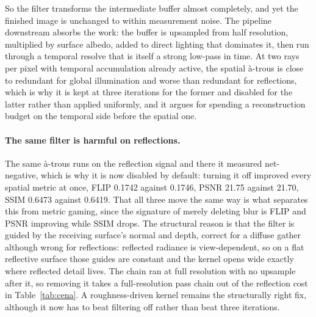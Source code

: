 So the filter transforms the intermediate buffer almost completely, and yet the finished image is
unchanged to within measurement noise. The pipeline downstream absorbs the work: the buffer is
upsampled from half resolution, multiplied by surface albedo, added to direct lighting that dominates
it, then run through a temporal resolve that is itself a strong low-pass in time. At two rays per pixel with
temporal accumulation already active, the spatial à-trous is close to redundant for global
illumination and worse than redundant for reflections, which is why it is kept at three iterations
for the former and disabled for the latter rather than applied uniformly, and it argues for spending
a reconstruction budget on the temporal side before the spatial one.

\paragraph{The same filter is harmful on reflections.} The same à-trous runs on the reflection signal
and there it measured net-negative, which is why it is now disabled by default: turning it off
improved every spatial metric at once, FLIP 0.1742 against 0.1746, PSNR 21.75 against 21.70, SSIM
0.6473 against 0.6419. That all three move the same way is what separates this from metric gaming,
since the signature of merely deleting blur is FLIP and PSNR improving while SSIM drops. The
structural reason is that the filter is guided by the receiving surface's normal and depth, correct
for a diffuse gather although wrong for reflections: reflected radiance is view-dependent, so on a
flat reflective surface those guides are constant and the kernel opens wide exactly where reflected
detail lives. The chain ran at full resolution with no upsample after it, so removing it takes a
full-resolution pass chain out of the reflection cost in
Table~\ref{tab:cena}. A roughness-driven kernel remains the structurally right fix, although it now
has to beat filtering off rather than beat three iterations.

